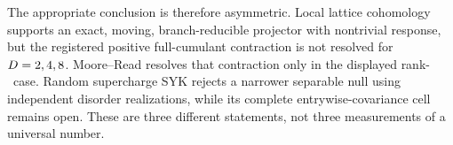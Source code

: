 The appropriate conclusion is therefore asymmetric.  Local lattice
cohomology supports an exact, moving, branch-reducible projector with
nontrivial response, but the registered positive full-cumulant contraction is
not resolved for $D=2,
4,8$.  Moore--Read resolves that
contraction only in the displayed rank-\MooreReadNSixRank\ case.  Random
supercharge SYK rejects a narrower separable null using independent disorder
realizations, while its complete entrywise-covariance cell remains open.
These are three different statements, not three measurements of a universal
number.
